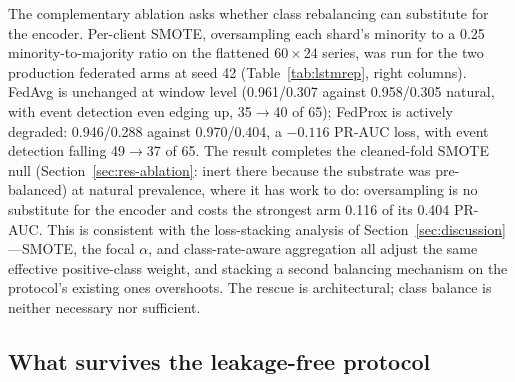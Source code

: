 The complementary ablation asks whether class rebalancing can
substitute for the encoder. Per-client SMOTE, oversampling each
shard's minority to a 0.25 minority-to-majority ratio on the
flattened $60\times24$ series, was run for the two production
federated arms at seed 42 (Table~\ref{tab:lstmrep}, right columns).
FedAvg is unchanged at window level (0.961/0.307 against 0.958/0.305
natural, with event detection even edging up, 35$\to$40 of 65);
FedProx is actively degraded:
0.946/0.288 against 0.970/0.404, a $-0.116$ PR-AUC loss, with
event detection falling 49$\to$37 of 65. The result completes the
cleaned-fold SMOTE null (Section~\ref{sec:res-ablation}: inert
there because the substrate was pre-balanced) at natural
prevalence, where it has work to do: oversampling is no substitute
for the encoder and costs the strongest arm 0.116 of its 0.404
PR-AUC. This is consistent with the loss-stacking analysis of
Section~\ref{sec:discussion}---SMOTE, the focal $\alpha$, and
class-rate-aware aggregation all adjust the same effective
positive-class weight, and stacking a second balancing mechanism on
the protocol's existing ones overshoots. The rescue is
architectural; class balance is neither necessary nor sufficient.

\subsection{What survives the leakage-free protocol}
\label{sec:res-leakfree-discussion}

